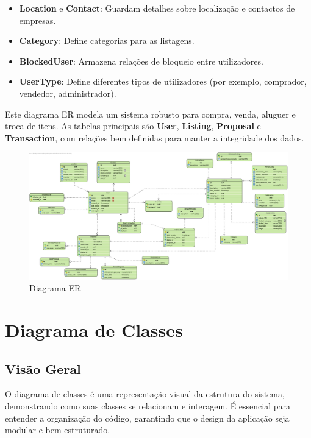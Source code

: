 \documentclass[a4paper, 12pt]{article} %
\begin{document}
\begin{itemize}
    \item \textbf{Location} e \textbf{Contact}: Guardam detalhes sobre localização e contactos de empresas.
    \item \textbf{Category}: Define categorias para as listagens.
    \item \textbf{BlockedUser}: Armazena relações de bloqueio entre utilizadores.
    \item \textbf{UserType}: Define diferentes tipos de utilizadores (por exemplo, comprador, vendedor, administrador).
\end{itemize}

Este diagrama ER modela um sistema robusto para compra, venda, aluguer e troca de itens. As tabelas principais são \textbf{User}, \textbf{Listing}, \textbf{Proposal} e \textbf{Transaction}, com relações bem definidas para manter a integridade dos dados.


\begin{figure}[ht]
	\centering
	\includegraphics[width=\textwidth]{RelatorioPDS/diagrama_er.jpg}
	\caption{Diagrama ER}
	\label{fig:diagrama_er}
\end{figure}


\newpage
\section{Diagrama de Classes}

\subsection{Visão Geral}  

O diagrama de classes é uma representação visual da estrutura do sistema, demonstrando como suas classes se relacionam e interagem. É essencial para entender a organização do código, garantindo que o design da aplicação seja modular e bem estruturado.
\end{document}
